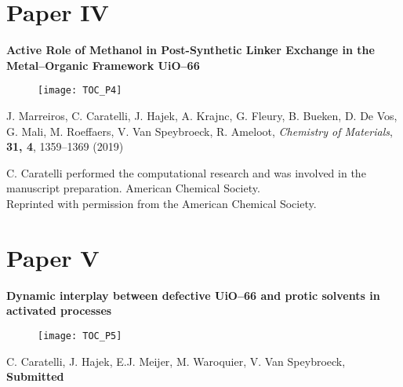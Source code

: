 \section*{Paper IV}

\vspace{0.1\textheight}
{
\large
\textbf{Active Role of Methanol in Post-Synthetic Linker Exchange in the Metal–Organic Framework UiO--66} }
\begin{figure}[h!]
	\centering
	\texttt{[image: TOC\_P4]}
\end{figure}
 
\noindent
J. Marreiros, C. Caratelli, J. Hajek, A. Krajnc, G. Fleury, B. Bueken, D. De Vos, G. Mali, M. Roeffaers, V. Van Speybroeck, R. Ameloot, \textit{Chemistry of Materials}, \textbf{31, 4}, 1359--1369
(2019)

\vfill

\noindent C. Caratelli performed the computational research and was involved in the manuscript preparation.
\npar
\noindent {} American Chemical Society. \\
Reprinted with permission from the American Chemical Society.

\clearpage{\pagestyle{empty}\cleardoublepage}
 
\clearpage{\pagestyle{empty}\cleardoublepage}
 
\clearpage{\pagestyle{empty}\cleardoublepage}

\section*{Paper V}

\vspace{0.1\textheight}
{
\large
\textbf{Dynamic interplay between defective UiO--66 and protic solvents in activated processes} }
\begin{figure}[h!]
	\centering
	\texttt{[image: TOC\_P5]}
\end{figure}
 
\noindent
C. Caratelli, J. Hajek, E.J. Meijer, M. Waroquier, V. Van Speybroeck, \textbf{Submitted}

